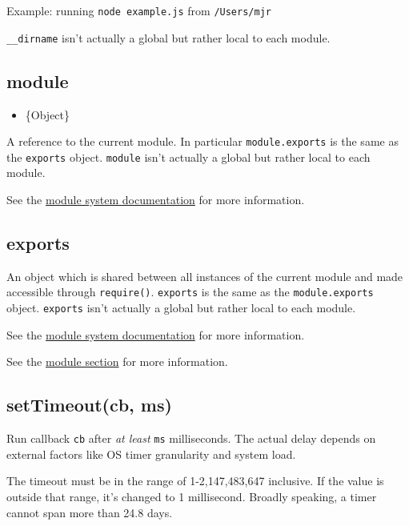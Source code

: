 Example: running \texttt{node example.js} from \texttt{/Users/mjr}

\begin{Shaded}
\begin{Highlighting}[]
\end{Highlighting}
\end{Shaded}

\texttt{\_\_dirname} isn't actually a global but rather local to each
module.

\subsection{module}

\begin{itemize}
\item
  \{Object\}
\end{itemize}

A reference to the current module. In particular \texttt{module.exports}
is the same as the \texttt{exports} object. \texttt{module} isn't
actually a global but rather local to each module.

See the \href{modules.html}{module system documentation} for more
information.

\subsection{exports}

An object which is shared between all instances of the current module
and made accessible through \texttt{require()}. \texttt{exports} is the
same as the \texttt{module.exports} object. \texttt{exports} isn't
actually a global but rather local to each module.

See the \href{modules.html}{module system documentation} for more
information.

See the \href{modules.html}{module section} for more information.

\subsection{setTimeout(cb, ms)}

Run callback \texttt{cb} after \emph{at least} \texttt{ms} milliseconds.
The actual delay depends on external factors like OS timer granularity
and system load.

The timeout must be in the range of 1-2,147,483,647 inclusive. If the
value is outside that range, it's changed to 1 millisecond. Broadly
speaking, a timer cannot span more than 24.8 days.

